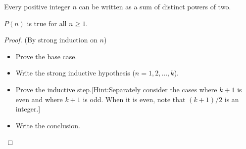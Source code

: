 \documentclass[12pt]{article}
\newcommand{\vs}{\vspace{2mm}}
\newcommand{\ls}{\vspace{5mm}}
\begin{document}

  Every positive integer $n$ can be written as a sum of distinct powers of two.
\ls\

 $P(n)$ is true for all $n \geq 1$.
\vs\

\begin{proof} (By strong induction on $n$)

    \begin{itemize}
    \item Prove the base case.
    \item Write the strong inductive hypothesis ($n=1, 2, \ldots, k$).
    \item Prove the inductive step.[Hint:Separately consider the cases where $k + 1$ is even and where $k+1$ is odd. When it is even, note that $(k + 1)/2$ is an integer.] 
    \item Write the conclusion. 
    \end{itemize}
    
\end{proof}
\end{document}
